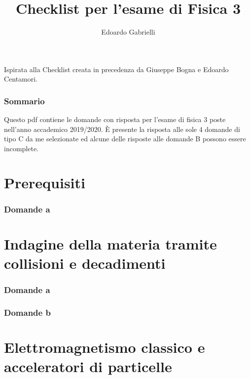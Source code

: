 \documentclass[10pt,a4paper]{article}
\author{Edoardo Gabrielli}
\title{Checklist per l'esame di Fisica 3}
\begin{document}
\maketitle
Ispirata alla Checklist creata in precedenza da Giuseppe Bogna e Edoardo Centamori. 



\section*{\centering Sommario}
Questo pdf contiene le domande con risposta per l'esame di fisica 3 poste nell'anno accademico 2019/2020. È presente la risposta alle sole 4 domande di tipo C da me selezionate ed alcune delle risposte alle domande B possono essere incomplete. 

\clearpage

\tableofcontents

\listoffigures
\clearpage


\part{Prerequisiti}
\section{Domande a}


\part{Indagine della materia tramite collisioni e decadimenti}
\setcounter{section}{0}
\renewcommand*{\theHsection}{chX.\the\value{section}}
\section{Domande a}
\section{Domande b}


\part{Elettromagnetismo classico e acceleratori di particelle}
\setcounter{section}{0}
\renewcommand*{\theHsection}{chX.\the\value{section}}
\end{document}
